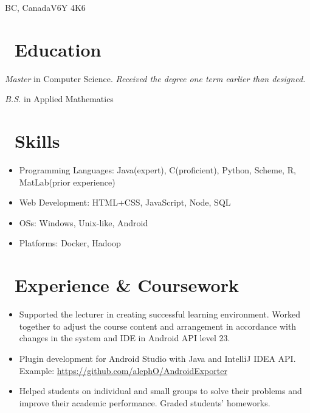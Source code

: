 \documentclass{resume}
\begin{document}


\address{9373 Hemlock Dr, Richmond}{BC, Canada}{V6Y 4K6}
 
\section{\texorpdfstring{\faGraduationCap}\ \ Education}
\textit{Master} in Computer Science. \textit{Received the degree one term earlier than designed.}

\textit{B.S.} in Applied Mathematics



\section{\texorpdfstring{\faCogs}\ \ Skills}
\begin{itemize}[parsep=0.5ex]
  \item Programming Languages: Java(expert), C(proficient), Python, Scheme, R, MatLab(prior experience)
  \item Web Development: HTML+CSS, JavaScript, Node, SQL
  \item OSs: Windows, Unix-like, Android
  \item Platforms: Docker, Hadoop
\end{itemize}



\section{\texorpdfstring{\faUsers}\ \ Experience \& Coursework}

\begin{itemize}
  \item Supported the lecturer in creating successful learning environment. Worked together to adjust the course content and arrangement in accordance with changes in the system and IDE in Android API level 23.
  \item Plugin development for Android Studio with Java and IntelliJ IDEA API. 
  \newline
  Example: \href{https://github.com/alephO/AndroidExporter}{https://github.com/alephO/AndroidExporter}
  \item Helped students on individual and small groups to solve their problems and improve their academic performance. Graded students' homeworks.
\end{itemize}
\end{document}
